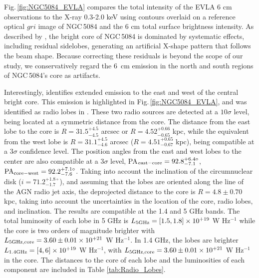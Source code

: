 \documentclass[modern]{aastex631}
\begin{document}
Fig.\,\ref{fig:NGC5084_EVLA} compares the total intensity of the EVLA 6 cm observations to the X-ray 0.3-2.0 keV using contours overlaid on a reference optical $gri$ image of NGC\,5084 and the 6 cm total surface brightness intensity. As described by \citet{wiegert+2015aj150_81}, the bright core of NGC\,5084 is dominated by systematic effects, including residual sidelobes, generating an artificial X-shape pattern that follows the beam shape. Because correcting these residuals is beyond the scope of our study, we conservatively regard the 6~cm emission in the north and south regions of NGC\,5084's core as artifacts.


Interestingly, \citet{wiegert+2015aj150_81} identifies extended emission to the east and west of the central bright core. This emission is highlighted in Fig.\,\ref{fig:NGC5084_EVLA}, and was identified as radio lobes in \citet[][see their Table 10]{irwin+2019aj158_21}. These two radio sources are detected at a $10\sigma$ level, being located at a symmetric distance from the core. The distance from the east lobe to the core is $R=31.5^{+4.5}_{-4.5}$ arcsec or $R=4.52^{+0.66}_{-0.65}$ kpc, while the equivalent from the west lobe is $R=31.1^{+4.5}_{-4.6}$ arcsec ($R=4.51^{+0.65}_{-0.67}$ kpc), being compatible at a $3\sigma$ confidence level. The position angles from the east and west lobes to the center are also compatible at a $3\sigma$ level, PA$_{\rm east - core} =92.8^{+6.4\circ}_{-7.1}$, $\rm{PA}_{\rm core - west} =92.2^{+7.1\circ}_{-7.6}$. Taking into account the inclination of the circumnuclear disk ($i=71.2^{+1.8\circ}_{-1.7}$), and assuming that the lobes are oriented along the line of the AGN radio jet axis, the deprojected distance to the core is $R=4.8\pm0.70$ kpc, taking into account the uncertainties in the location of the core, radio lobes, and inclination. The results are compatible at the 1.4 and 5 GHz bands. The total luminosity of each lobe in 5 GHz is $L_{\rm 5 GHz} = [1.5,1.8] \times 10^{+19}$ W Hz$^{-1}$ while the core is two orders of magnitude brighter with $L_{\rm 5 GHz, core} = 3.60\pm0.01 \times 10^{+21}$ W Hz$^{-1}$. In 1.4 GHz, the lobes are brighter $L_{\rm 1.4 GHz} = [4,6] \times 10^{+19}$ W Hz$^{-1}$, with $L_{\rm 5 GHz, core} = 3.60\pm0.01 \times 10^{+21}$ W Hz$^{-1}$ in the core. The distances to the core of each lobe and the luminosities of each component are included in Table \ref{tab:Radio_Lobes}.  
\end{document}
